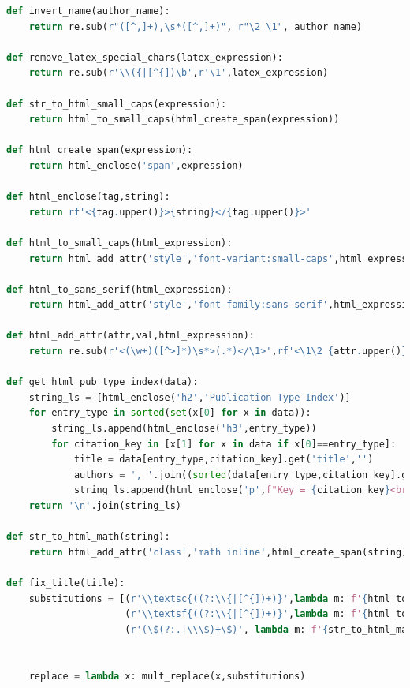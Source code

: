 \documentclass[11pt,a4paper]{report}
\begin{document}
\begin{appendices}
\begin{lstlisting}[language=python]
def invert_name(author_name):
    return re.sub(r"([^,]+),\s*([^,]+)", r"\2 \1", author_name)

def remove_latex_special_chars(latex_expression):
    return re.sub(r'\\({|[^{])\b',r'\1',latex_expression)

def str_to_html_small_caps(expression):
    return html_to_small_caps(html_create_span(expression))

def html_create_span(expression):
    return html_enclose('span',expression)

def html_enclose(tag,string):
    return rf'<{tag.upper()}>{string}</{tag.upper()}>'

def html_to_small_caps(html_expression):
    return html_add_attr('style','font-variant:small-caps',html_expression)

def html_to_sans_serif(html_expression):
    return html_add_attr('style','font-family:sans-serif',html_expression)

def html_add_attr(attr,val,html_expression):
    return re.sub(r'<(\w+)([^>]*)\s*>(.*)</\1>',rf'<\1\2 {attr.upper()}="{val}">\3</\1>',html_expression)

def get_html_pub_type_index(data):
    string_ls = [html_enclose('h2','Publication Type Index')]
    for entry_type in sorted(set(x[0] for x in data)):
        string_ls.append(html_enclose('h3',entry_type))
        for citation_key in [x[1] for x in data if x[0]==entry_type]:
            title = data[entry_type,citation_key].get('title','')
            authors = ', '.join((sorted(data[entry_type,citation_key].get('author',''))))
            string_ls.append(html_enclose('p',f"Key = {citation_key}<br>Title = {fix_title(title)}<br>Autores = {authors}"))
    return '\n'.join(string_ls)

def str_to_html_math(string):
    return html_add_attr('class','math inline',html_create_span(string))

def fix_title(title):
    substitutions = [(r'\\textsc{((?:\\{|[^{])+)}',lambda m: f'{html_to_small_caps(html_create_span(m.group(1)))}'),
                     (r'\\textsf{((?:\\{|[^{])+)}',lambda m: f'{html_to_sans_serif(html_create_span(m.group(1)))}'),
                     (r'(\$(?:.|\\\$)+\$)', lambda m: f'{str_to_html_math(m.group(1))}')]


    replace = lambda x: mult_replace(x,substitutions)


\end{lstlisting}
\end{appendices}
\end{document}

